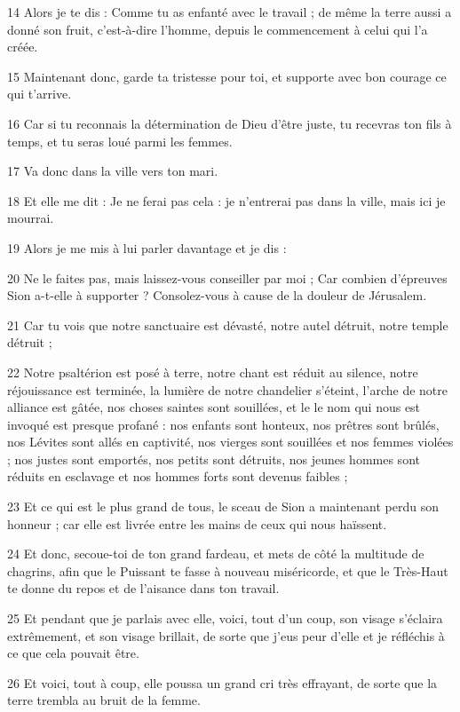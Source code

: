 \par 14 Alors je te dis : Comme tu as enfanté avec le travail ; de même la terre aussi a donné son fruit, c'est-à-dire l'homme, depuis le commencement à celui qui l'a créée.
\par 15 Maintenant donc, garde ta tristesse pour toi, et supporte avec bon courage ce qui t'arrive.
\par 16 Car si tu reconnais la détermination de Dieu d'être juste, tu recevras ton fils à temps, et tu seras loué parmi les femmes.
\par 17 Va donc dans la ville vers ton mari.
\par 18 Et elle me dit : Je ne ferai pas cela : je n'entrerai pas dans la ville, mais ici je mourrai.
\par 19 Alors je me mis à lui parler davantage et je dis :
\par 20 Ne le faites pas, mais laissez-vous conseiller par moi ; Car combien d'épreuves Sion a-t-elle à supporter ? Consolez-vous à cause de la douleur de Jérusalem.
\par 21 Car tu vois que notre sanctuaire est dévasté, notre autel détruit, notre temple détruit ;
\par 22 Notre psaltérion est posé à terre, notre chant est réduit au silence, notre réjouissance est terminée, la lumière de notre chandelier s'éteint, l'arche de notre alliance est gâtée, nos choses saintes sont souillées, et le le nom qui nous est invoqué est presque profané : nos enfants sont honteux, nos prêtres sont brûlés, nos Lévites sont allés en captivité, nos vierges sont souillées et nos femmes violées ; nos justes sont emportés, nos petits sont détruits, nos jeunes hommes sont réduits en esclavage et nos hommes forts sont devenus faibles ;
\par 23 Et ce qui est le plus grand de tous, le sceau de Sion a maintenant perdu son honneur ; car elle est livrée entre les mains de ceux qui nous haïssent.
\par 24 Et donc, secoue-toi de ton grand fardeau, et mets de côté la multitude de chagrins, afin que le Puissant te fasse à nouveau miséricorde, et que le Très-Haut te donne du repos et de l'aisance dans ton travail.
\par 25 Et pendant que je parlais avec elle, voici, tout d'un coup, son visage s'éclaira extrêmement, et son visage brillait, de sorte que j'eus peur d'elle et je réfléchis à ce que cela pouvait être.
\par 26 Et voici, tout à coup, elle poussa un grand cri très effrayant, de sorte que la terre trembla au bruit de la femme.
